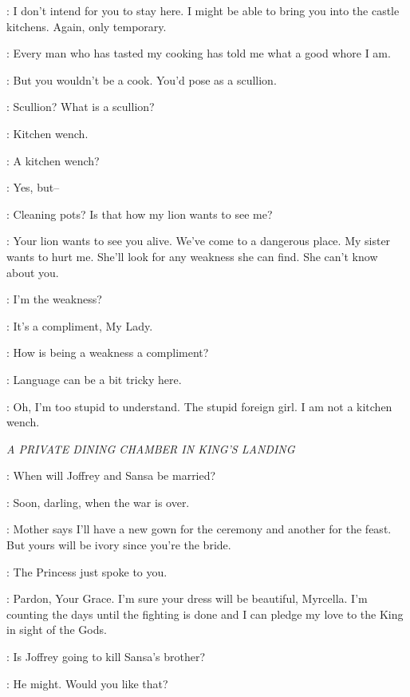 \TYRION: I don't intend for you to stay here. I might be able to bring you into the castle kitchens. Again, only temporary. 

\SHAE: Every man who has tasted my cooking has told me what a good whore I am. 

\TYRION: But you wouldn't be a cook. You'd pose as a scullion. 

\SHAE: Scullion? What is a scullion? 

\TYRION: Kitchen wench. 

\SHAE: A kitchen wench? 

\TYRION: Yes, but-- 

\SHAE: Cleaning pots? Is that how my lion wants to see me? 

\TYRION: Your lion wants to see you alive. We've come to a dangerous place. My sister wants to hurt me. She'll look for any weakness she can find. She can't know about you. 

\SHAE: I'm the weakness? 

\TYRION: It's a compliment, My Lady. 

\SHAE: How is being a weakness a compliment? 

\TYRION: Language can be a bit tricky here. 

\SHAE: Oh, I'm too stupid to understand. The stupid foreign girl. I am not a kitchen wench. 


\scene

\textit{A PRIVATE DINING CHAMBER IN KING'S LANDING} 


\MYRCELLA: When will Joffrey and Sansa be married? 

\CERSEI: Soon, darling, when the war is over. 

\MYRCELLA: Mother says I'll have a new gown for the ceremony and another for the feast. But yours will be ivory since you're the bride. 


\CERSEI: The Princess just spoke to you. 

\SANSA: Pardon, Your Grace. I'm sure your dress will be beautiful, Myrcella. I'm counting the days until the fighting is done and I can pledge my love to the King in sight of the Gods. 

\TOMMEN: Is Joffrey going to kill Sansa's brother? 

\CERSEI: He might. Would you like that? 

